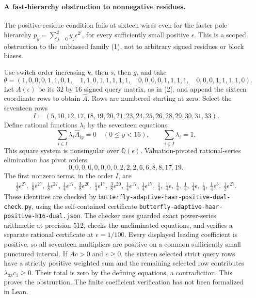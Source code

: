 \documentclass[11pt]{article}
\begin{document}
\paragraph{A fast-hierarchy obstruction to nonnegative residues.}
The positive-residue condition fails at sixteen wires even for the faster
pole hierarchy $p_y=\sum_{j=0}^3y_j\epsilon^{2^j}$, for every sufficiently
small positive $\epsilon$. This is a scoped obstruction to the unbiassed
family (1), not to arbitrary signed residues or block biases.

Use switch order increasing $k$, then $s$, then $g$, and take
\[
\theta=(1,0,0,0,1,1,0,1,\quad
1,1,0,1,1,1,1,1,\quad
0,0,0,0,1,1,1,1,\quad
0,0,0,1,1,1,1,0).
\]
Let $A(\epsilon)$ be its $32$ by $16$ signed query matrix, as in (2),
and append the sixteen coordinate rows to obtain $\widehat A$.
Rows are numbered starting at zero. Select the seventeen rows
\[
 I=(5,10,12,17,18,19,20,21,23,24,25,26,28,29,30,31,33).
\]
Define rational functions $\lambda_i$ by the seventeen equations
\[
 \sum_{i\in I}\lambda_i\widehat A_{iy}=0\quad(0\leq y<16),
 \qquad \sum_{i\in I}\lambda_i=1.
\]
This square system is nonsingular over $\mathbb Q(\epsilon)$.
Valuation-pivoted rational-series elimination has pivot orders
\[
 0,0,0,0,0,0,0,0,2,2,2,6,6,8,8,17,19.
\]
The first nonzero terms, in the order $I$, are
\[
\begin{gathered}
 \tfrac12\epsilon^{27},\ \tfrac18\epsilon^{27},\
 \tfrac18\epsilon^{27},\ \tfrac14\epsilon^{17},\
 \tfrac38\epsilon^{20},\ \tfrac14\epsilon^{17},\
 \tfrac38\epsilon^{20},\ \tfrac14\epsilon^{17},\
 \tfrac14\epsilon^{17},\ \tfrac14,\ \tfrac14\epsilon,\
 \tfrac14,\ \tfrac14,\ \tfrac14\epsilon,\ \tfrac14,\
 \tfrac14\epsilon^3,\ \tfrac12\epsilon^{27}.
\end{gathered}
\]
These identities are checked by
\texttt{butterfly-adaptive-haar-positive-dual-check.py}, using the
self-contained certificate
\texttt{butterfly-adaptive-haar-positive-h16-dual.json}.
The checker uses guarded exact power-series arithmetic at precision
$512$, checks the uneliminated equations, and verifies a separate
rational certificate at $\epsilon=1/100$.
Every displayed leading coefficient is positive, so all seventeen
multipliers are positive on a common sufficiently small punctured
interval. If $Ac>0$ and $c\geq0$, the sixteen selected strict query
rows have a strictly positive weighted sum and the remaining selected
row contributes $\lambda_{33}c_1\geq0$. Their total is zero by the
defining equations, a contradiction. This proves the obstruction.
The finite coefficient verification has not been formalized in Lean.
\end{document}
